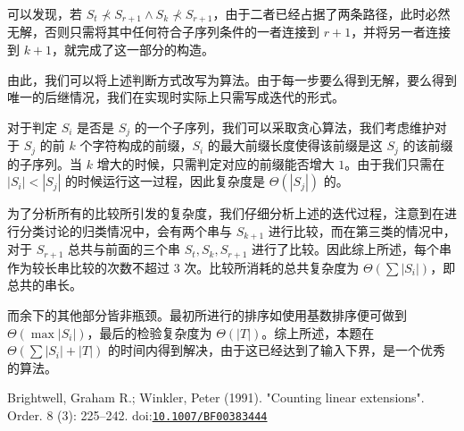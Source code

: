 \documentclass[12pt]{ctexart}
\begin{document}
可以发现，若 $S_t\nprec S_{r+1} \wedge S_k \nprec S_{r+1}$，由于二者已经占据了两条路径，此时必然无解，否则只需将其中任何符合子序列条件的一者连接到 $r+1$，并将另一者连接到 $k+1$，就完成了这一部分的构造。

由此，我们可以将上述判断方式改写为算法。由于每一步要么得到无解，要么得到唯一的后继情况，我们在实现时实际上只需写成迭代的形式。

对于判定 $S_i$ 是否是 $S_j$ 的一个子序列，我们可以采取贪心算法，我们考虑维护对于 $S_j$ 的前 $k$ 个字符构成的前缀，$S_i$ 的最大前缀长度使得该前缀是这 $S_j$ 的该前缀的子序列。当 $k$ 增大的时候，只需判定对应的前缀能否增大 $1$。由于我们只需在 $|S_i|<|S_j|$ 的时候运行这一过程，因此复杂度是 $\Theta(|S_j|)$ 的。

为了分析所有的比较所引发的复杂度，我们仔细分析上述的迭代过程，注意到在进行分类讨论的归类情况中，会有两个串与 $S_{k+1}$ 进行比较，而在第三类的情况中，对于 $S_{r+1}$ 总共与前面的三个串 $S_t,S_k,S_{r+1}$ 进行了比较。因此综上所述，每个串作为较长串比较的次数不超过 $3$ 次。比较所消耗的总共复杂度为 $\Theta(\sum |S_i|)$，即总共的串长。

而余下的其他部分皆非瓶颈。最初所进行的排序如使用基数排序便可做到 $\Theta(\max |S_i|)$，最后的检验复杂度为 $\Theta(|T|)$。综上所述，本题在 $\Theta(\sum |S_i| + |T|)$ 的时间内得到解决，由于这已经达到了输入下界，是一个优秀的算法。

\newpage

\begin{thebibliography}{}
 Brightwell, Graham R.; Winkler, Peter (1991). "Counting linear extensions". Order. 8 (3): 225–242. doi:\href{https://doi.org/10.1007\%2FBF00383444}{\texttt{10.1007/BF00383444}}
\end{thebibliography}
\end{document}
